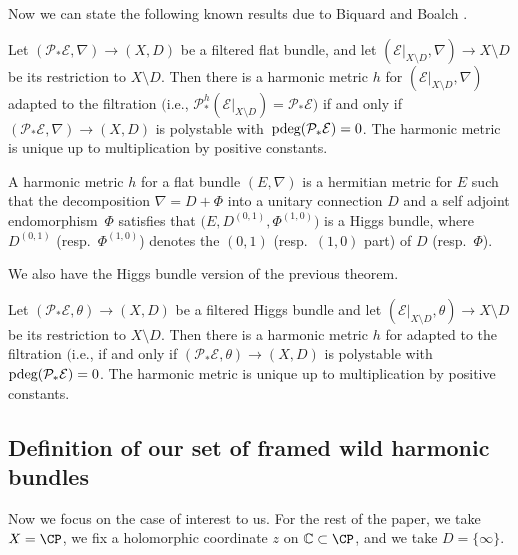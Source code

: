 Now we can state the following known results due to Biquard and Boalch \cite{BB04}.

\begin{Theorem} \label{HMFB} Let $(\mathcal{P}_*\mathcal{E},\nabla)\to (X,D)$ be a filtered flat bundle, and let $(\mathcal{E}|_{X\setminus D},\nabla) \to X\setminus D$ be its restriction to $X\setminus D$. Then there is a harmonic metric $h$ for $(\mathcal{E}|_{X\setminus D},\nabla)$ adapted to the filtration $\bigl($i.e., $\mathcal{P}^h_*(\mathcal{E}|_{X\setminus D})=\mathcal{P}_*\mathcal{E}\bigr)$ if and only if $(\mathcal{P}_*\mathcal{E},\nabla)\to (X,D)$ is polystable with~$\textnormal{pdeg}(\mathcal{P}_*\mathcal{E})=0$. The harmonic metric is unique up to multiplication by positive constants.
\end{Theorem}

\begin{Remark} A harmonic metric $h$ for a flat bundle $(E,\nabla)$ is a hermitian metric for $E$ such that the decomposition $\nabla=D+\Phi$ into a unitary connection $D$ and a self adjoint endomorphism~$\Phi$ satisfies that $\bigl(E,D^{(0,1)},\Phi^{(1,0)}\bigr)$ is a Higgs bundle, where $D^{(0,1)}$ \big(resp.\ $\Phi^{(1,0)}$\big) denotes the $(0,1)$ (resp.\ $(1,0)$ part) of $D$ (resp.\ $\Phi$).
\end{Remark}

We also have the Higgs bundle version of the previous theorem.

\begin{Theorem} \label{HMHB} Let $(\mathcal{P}_*\mathcal{E},\theta)\to (X,D)$ be a filtered Higgs bundle and let $(\mathcal{E}|_{X\setminus D},\theta) \to X\setminus D$ be its restriction to $X\setminus D$. Then there is a harmonic metric $h$ for  adapted to the filtration $\bigl($i.e.,  if and only if $(\mathcal{P}_*\mathcal{E},\theta)\to (X,D)$ is polystable with~$\textnormal{pdeg}(\mathcal{P}_*\mathcal{E})=0$. The harmonic metric is unique up to multiplication by positive constants.
\end{Theorem}

\subsection{Definition of our set of framed wild harmonic bundles}\label{secdeffwhb}

Now we focus on the case of interest to us. For the rest of the paper, we take $X=\CP$, we fix a holomorphic coordinate $z$ on $\mathbb{C}\subset \CP$, and we take $D=\{\infty\}$.


